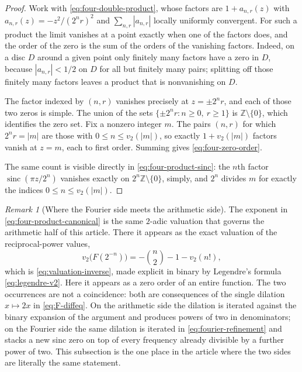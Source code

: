 \documentclass[11pt,oneside]{article}
\theoremstyle{definition}
\theoremstyle{remark}
\newtheorem{remark}[theorem]{Remark}
\newcommand{\Z}{\mathbb Z}
\newcommand{\sinc}{\operatorname{sinc}}
\newcommand{\vtwo}{v_2}
\begin{document}
\begin{proof}
Work with \eqref{eq:four-double-product}, whose factors are $1+a_{n,r}(z)$ with
$a_{n,r}(z)=-z^2/(2^nr)^2$ and $\sum_{n,r}|a_{n,r}|$ locally uniformly convergent.  For such
a product the limit vanishes at a point exactly when one of the factors does, and the order
of the zero is the sum of the orders of the vanishing factors.  Indeed, on a disc $D$ around
a given point only finitely many factors have a zero in $D$, because $|a_{n,r}|<1/2$ on $D$
for all but finitely many pairs; splitting off those finitely many factors leaves a product
that is nonvanishing on $D$.

The factor indexed by $(n,r)$ vanishes precisely at $z=\pm2^nr$, and each of those two zeros
is simple.  The union of the sets $\{\pm 2^nr:n\ge0,\ r\ge1\}$ is $\Z\setminus\{0\}$, which
identifies the zero set.  Fix a nonzero integer $m$.  The pairs $(n,r)$ for which
$2^nr=|m|$ are those with $0\le n\le\vtwo(|m|)$, so exactly $1+\vtwo(|m|)$ factors vanish at
$z=m$, each to first order.  Summing gives \eqref{eq:four-zero-order}.

The same count is visible directly in \eqref{eq:four-product-sinc}: the $n$th factor
$\sinc(\pi z/2^n)$ vanishes exactly on $2^n\Z\setminus\{0\}$, simply, and $2^n$ divides $m$
for exactly the indices $0\le n\le\vtwo(|m|)$.
\end{proof}

\begin{remark}[Where the Fourier side meets the arithmetic side]
\label{rem:four-valuation-bridge}
The exponent in \eqref{eq:four-product-canonical} is the same $2$-adic valuation that governs
the arithmetic half of this article.  There it appears as the exact valuation of the
reciprocal-power values,
\begin{equation*}
 \vtwo\bigl(F(2^{-n})\bigr)=-\binom n2-1-\vtwo(n!),
\end{equation*}
which is \eqref{eq:valuation-inverse}, made explicit in binary by Legendre's formula
\eqref{eq:legendre-v2}.  Here it appears as a zero order of an entire function.  The two
occurrences are not a coincidence: both are consequences of the single dilation
$x\mapsto2x$ in \eqref{eq:F-diffeq}.  On the arithmetic side the dilation is iterated against
the binary expansion of the argument and produces powers of two in denominators; on the
Fourier side the same dilation is iterated in \eqref{eq:fourier-refinement} and stacks a new
sinc zero on top of every frequency already divisible by a further power of two.  This
subsection is the one place in the article where the two sides are literally the same
statement.
\end{remark}
\end{document}
